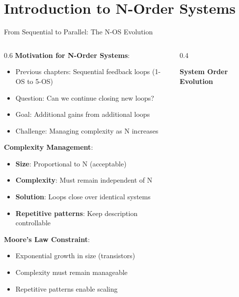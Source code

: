 \documentclass[aspectratio=169]{beamer}
\newcommand{\concept}[1]{\textbf{\color{darkblue}#1}}
\begin{document}
\section{Introduction to N-Order Systems}

\begin{frame}{From Sequential to Parallel: The N-OS Evolution}
\begin{columns}
\begin{column}{0.6\textwidth}
\concept{Motivation for N-Order Systems}:
\begin{itemize}
\item Previous chapters: Sequential feedback loops (1-OS to 5-OS)
\item Question: Can we continue closing new loops?
\item Goal: Additional gains from additional loops
\item Challenge: Managing complexity as N increases
\end{itemize}

\vspace{0.3cm}
\concept{Complexity Management}:
\begin{itemize}
\item \textbf{Size}: Proportional to N (acceptable)
\item \textbf{Complexity}: Must remain independent of N
\item \textbf{Solution}: Loops close over identical systems
\item \textbf{Repetitive patterns}: Keep description controllable
\end{itemize}

\vspace{0.3cm}
\concept{Moore's Law Constraint}:
\begin{itemize}
\item Exponential growth in size (transistors)
\item Complexity must remain manageable
\item Repetitive patterns enable scaling
\end{itemize}
\end{column}
\begin{column}{0.4\textwidth}
\begin{center}
\textbf{System Order Evolution}
\vspace{0.3cm}

\end{center}
\end{column}
\end{columns}
\end{frame}
\end{document}
